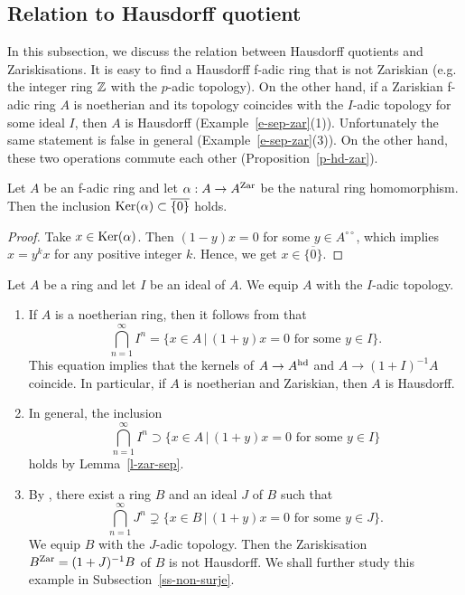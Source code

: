 \subsection{Relation to Hausdorff quotient}\label{ss-zar-haus}

In this subsection, we discuss the relation between 
Hausdorff quotients and Zariskisations. 
It is easy to find a Hausdorff f-adic ring that is not Zariskian 
(e.g. the integer ring $\mathbb{Z}$ with the $p$-adic topology). 
On the other hand, if a Zariskian f-adic ring $A$ 
is noetherian and its topology coincides with the $I$-adic topology for some ideal $I$, 
then $A$ is Hausdorff (Example~\ref{e-sep-zar}(1)). 
Unfortunately the same statement is false in general 
(Example~\ref{e-sep-zar}(3)). 
On the other hand, these two operations commute each other (Proposition~\ref{p-hd-zar}). 



\begin{lem}\label{l-zar-sep}
Let $A$ be an f-adic ring and let $\alpha:A \to A^{{\operatorname{Zar}}}$ 
be the natural ring homomorphism. 
Then the inclusion ${\operatorname{Ker}}(\alpha) \subset \overline{\{0\}}$ holds.
\end{lem}

\begin{proof}
Take $x \in {\operatorname{Ker}}(\alpha)$. 
Then $(1-y)x=0$ for some $y \in A^{\circ\circ}$, which implies 
$x=y^kx$ for any positive integer $k$. 
Hence, we get $x \in \overline{\{0\}}$. 
\end{proof}


\begin{ex}\label{e-sep-zar}
Let $A$ be a ring and let $I$ be an ideal of $A$. 
We equip $A$ with the $I$-adic topology. 
\begin{enumerate}
\item 
If $A$ is a noetherian ring, then it follows from \cite[Theorem 10.17]{AM69} 
that 
$$\bigcap_{n=1}^{\infty} I^n=\{ x \in A\,|\,(1+y)x=0\text{ for some }y\in I\}.$$
This equation implies that the kernels of 
$A \to A^{{\operatorname{hd}}}$ and $A \to (1+I)^{-1}A$ coincide. 
In particular, if $A$ is noetherian and Zariskian, 
then $A$ is Hausdorff. 
\item 
In general, the inclusion 
$$\bigcap_{n=1}^{\infty} I^n \supset \{ x \in A\,|\,(1+y)x=0\text{ for some }y\in I\}$$
holds by Lemma~\ref{l-zar-sep}. 
\item 
By \cite[Remark (2) after Theorem 10.17]{AM69}, 
there exist a ring $B$ and an ideal $J$ of $B$ such that 
$$\bigcap_{n=1}^{\infty} J^n \supsetneq \{ x \in B\,|\,(1+y)x=0\text{ for some }y\in J\}.$$
We equip $B$ with the $J$-adic topology. 
Then the Zariskisation $B^{{\operatorname{Zar}}}=(1+J)^{-1}B$ of $B$ 
is not Hausdorff. 
We shall further study this example in Subsection~\ref{ss-non-surje}. 
\end{enumerate}
\end{ex}







